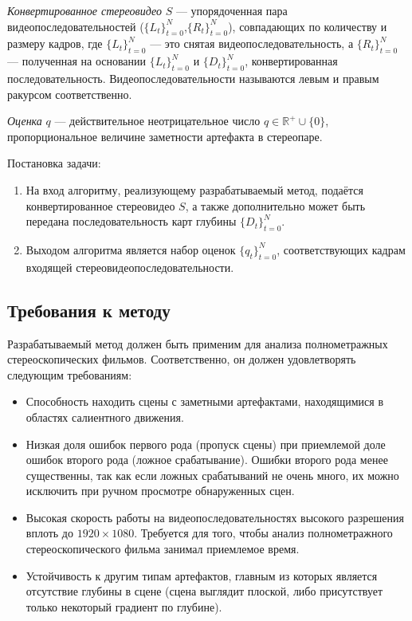 \documentclass[14pt, a4paper]{extarticle}
\begin{document}
\textit{Конвертированное стереовидео} $S$ --- упорядоченная пара видеопоследовательностей 
($\{L_t\}_{t=0}^N$,$\{R_t\}_{t=0}^N$), совпадающих по количеству и размеру кадров, 
где $\{L_t\}_{t=0}^N$ --- это снятая видеопоследовательность, а $\{R_t\}_{t=0}^N$ --- 
полученная на основании $\{L_t\}_{t=0}^N$ и $\{D_t\}_{t=0}^N$, конвертированная последовательность. 
Видеопоследовательности называются левым и правым ракурсом соответственно.

\textit{Оценка} $q$ --- действительное неотрицательное число $q \in \mathbb{R}^{+} \cup \{0\}$, 
пропорциональное величине заметности артефакта в стереопаре.

Постановка задачи:

\begin{enumerate}
	\item На вход алгоритму, реализующему разрабатываемый метод, 
	подаётся конвертированное стереовидео $S$, а также дополнительно может быть 
	передана последовательность карт глубины $\{D_t\}_{t=0}^N$.
	\item Выходом алгоритма является набор оценок $\{q_t\}_{t=0}^N$, 
	соответствующих кадрам входящей стереовидеопоследовательности.
\end{enumerate}

\subsection{Требования к методу}

Разрабатываемый метод должен быть применим для анализа полнометражных 
стереоскопических фильмов. Соответственно, он должен удовлетворять следующим требованиям:

\begin{itemize}
	\item Способность находить сцены с заметными артефактами, 
	находящимися в областях салиентного движения.
	\item Низкая доля ошибок первого рода (пропуск сцены) при приемлемой доле 
	ошибок второго рода (ложное срабатывание). Ошибки второго рода менее существенны, 
	так как если ложных срабатываний не очень много, их можно исключить 
	при ручном просмотре обнаруженных сцен.
	\item Высокая скорость работы на видеопоследовательностях высокого разрешения 
	вплоть до $1920 \times 1080$. Требуется для того, чтобы анализ 
	полнометражного стереоскопического фильма занимал приемлемое время.
	\item Устойчивость к другим типам артефактов, главным из которых является отсутствие 
	глубины в сцене (сцена выглядит плоской, либо присутствует только некоторый градиент по глубине).
\end{itemize}
\end{document}
